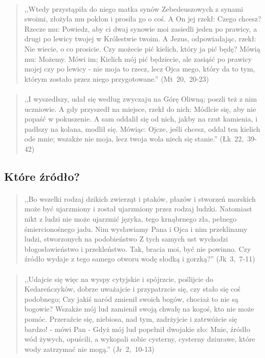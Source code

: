 \documentclass[10pt,a4paper,oneside]{article}
\begin{document}
\paragraph{}
\begin{quote}
,,Wtedy przystąpiła do niego matka synów Zebedeuszowych z synami swoimi, złożyła mu pokłon i prosiła go o coś. A On jej rzekł: Czego chcesz? Rzecze mu: Powiedz, aby ci dwaj synowie moi zasiedli jeden po prawicy, a drugi po lewicy twojej w Królestwie twoim. A Jezus, odpowiadając, rzekł: Nie wiecie, o co prosicie. Czy możecie pić kielich, który ja pić będę? Mówią mu: Możemy. Mówi im; Kielich mój pić będziecie, ale zasiąść po prawicy mojej czy po lewicy - nie moja to rzecz, lecz Ojca mego, który da to tym, którym zostało przez niego przygotowane.'' \mbox{(Mt 20, 20-23)}
\end{quote}
\paragraph{}
\begin{quote}
,,I wyszedłszy, udał się według zwyczaju na Górę Oliwną; poszli też z nim uczniowie. A gdy przyszedł na miejsce, rzekł do nich: Módlcie się, aby nie popaść w pokuszenie. A sam oddalił się od nich, jakby na rzut kamienia, i padłszy na kolana, modlił się. Mówiąc: Ojcze, jeśli chcesz, oddal ten kielich ode mnie; wszakże nie moja, lecz twoja wola niech się stanie.'' \mbox{(Łk 22, 39-42)}
\end{quote}
\subsection{Które źródło?}
\paragraph{}
\begin{quote}
,,Bo wszelki rodzaj dzikich zwierząt i ptaków, płazów i stworzeń morskich może być ujarzmiony i został ujarzmiony przez rodzaj ludzki. Natomiast nikt z ludzi nie może ujarzmić języka, tego krnąbrnego zła, pełnego śmiercionośnego jadu. Nim wysławiamy Pana i Ojca i nim przeklinamy ludzi, stworzonych na podobieństwo Z tych samych ust wychodzi błogosławieństwo i przekleństwo. Tak, bracia moi, być nie powinno. Czy źródło wydaje z tego samego otworu wodę słodką i gorzką?'' \mbox{(Jk 3, 7-11)}
\end{quote}
\paragraph{}
\begin{quote}
,,Udajcie się więc na wyspy cytyjskie i spójrzcie, poślijcie do Kedareńczyków, dobrze uważajcie i przypatrzcie się, czy stało się coś podobnego; Czy jakiś naród zmienił swoich bogów, chociaż to nie są bogowie? Wszakże mój lud zamienił swoją chwałę na kogoś, kto nie może pomóc. Przeraźcie się, niebiosa, nad tym, zadrżyjcie i zatrwóżcie się bardzo! - mówi Pan - Gdyż mój lud popełnił dwojakie zło: Mnie, źródło wód żywych, opuścili, a wykopali sobie cysterny, cysterny dziurawe, które wody zatrzymać nie mogą.'' \mbox{(Jr 2, 10-13)}
\end{quote}
\end{document}
